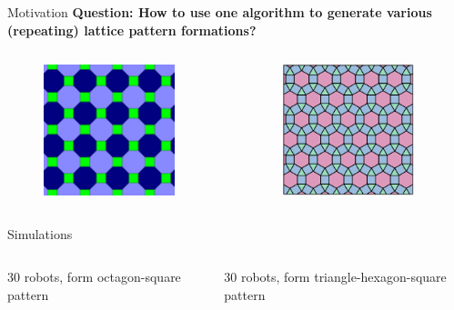 \documentclass[10pt]{beamer}
\begin{document}
\begin{frame}{Motivation}{}
  \textbf{Question: How to use one algorithm to generate
      various (repeating) lattice pattern formations?}
    \begin{columns}
    \begin{column}{.45\textwidth}
      \begin{figure}
        \centering
        \includegraphics[height=1.5in]{figs/tessellation2}
      \end{figure}
    \end{column}
    \begin{column}{.45\textwidth}
       \begin{figure}
         \centering
        \includegraphics[height=1.5in]{figs/tessellation1}
      \end{figure}
    \end{column}
  \end{columns} 
\end{frame}

\begin{frame}{Simulations}
  \begin{columns}
    \begin{column}{.45\textwidth}
      30 robots, form octagon-square pattern
       \begin{center}
       \end{center}
    \end{column}
    \begin{column}{.45\textwidth}
      30 robots, form triangle-hexagon-square pattern
       \begin{center}
       \end{center}
     \end{column}
  \end{columns}
\end{frame}
\end{document}
